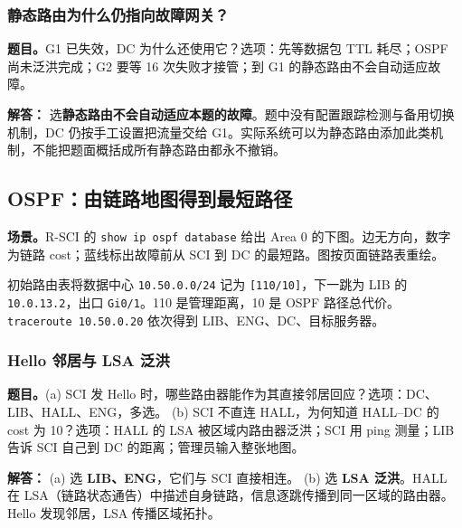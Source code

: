 \documentclass[11pt,a4paper,fontset=fandol]{ctexart}
\renewcommand{\exercisequestion}[2]{%
  \Needspace{5\baselineskip}%
  \subsubsection{#2}\label{exercise:#1}%
}
\renewenvironment{checkedsolution}
  {\par\nopagebreak[4]\textbf{解答：}\ignorespaces}
  {\par}
\begin{document}
\exercisequestion{SC2008-HW03-Q03}{静态路由为什么仍指向故障网关？}
\textbf{题目。}G1 已失效，DC 为什么还使用它？选项：先等数据包 TTL 耗尽；OSPF 尚未泛洪完成；G2 要等 16 次失败才接管；到 G1 的静态路由不会自动适应故障。
\begin{checkedsolution}
选\textbf{静态路由不会自动适应本题的故障}。题中没有配置跟踪检测与备用切换机制，DC 仍按手工设置把流量交给 G1。实际系统可以为静态路由添加此类机制，不能把题面概括成所有静态路由都永不撤销。
\end{checkedsolution}

\subsection{OSPF：由链路地图得到最短路径}

\textbf{场景。}R-SCI 的 \texttt{show ip ospf database} 给出 Area 0 的下图。边无方向，数字为链路 cost；蓝线标出故障前从 SCI 到 DC 的最短路。图按页面链路表重绘。
\begin{center}
\end{center}
初始路由表将数据中心 \texttt{10.50.0.0/24} 记为 \texttt{[110/10]}，下一跳为 LIB 的 \texttt{10.0.13.2}，出口 \texttt{Gi0/1}。110 是管理距离，10 是 OSPF 路径总代价。\texttt{traceroute 10.50.0.20} 依次得到 LIB、ENG、DC、目标服务器。

\exercisequestion{SC2008-HW03-Q04}{Hello 邻居与 LSA 泛洪}
\textbf{题目。}(a) SCI 发 Hello 时，哪些路由器能作为其直接邻居回应？选项：DC、LIB、HALL、ENG，多选。
(b) SCI 不直连 HALL，为何知道 HALL--DC 的 cost 为 10？选项：HALL 的 LSA 被区域内路由器泛洪；SCI 用 ping 测量；LIB 告诉 SCI 自己到 DC 的距离；管理员输入整张地图。
\begin{checkedsolution}
(a) 选 \textbf{LIB、ENG}，它们与 SCI 直接相连。
(b) 选 \textbf{LSA 泛洪}。HALL 在 LSA（链路状态通告）中描述自身链路，信息逐跳传播到同一区域的路由器。Hello 发现邻居，LSA 传播区域拓扑。
\end{checkedsolution}
\end{document}
